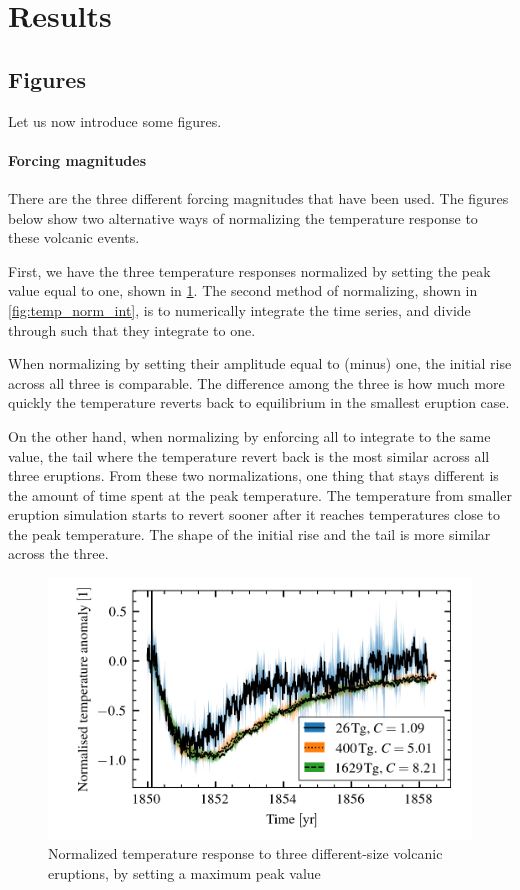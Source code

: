 \documentclass[twocol]{ametsocV5}
\begin{document}
\section{Results}

\subsection{Figures}

Let us now introduce some figures.

\paragraph{Forcing magnitudes}

There are the three different forcing magnitudes that have been used. The figures below
show two alternative ways of normalizing the temperature response to these volcanic
events.

First, we have the three temperature responses normalized by setting the peak value
equal to one, shown in \cref{fig:temp_norm_max}. The second method of normalizing, shown
in \cref{fig:temp_norm_int}, is to numerically integrate the time series, and divide
through such that they integrate to one.

When normalizing by setting their amplitude equal to (minus) one, the initial rise
across all three is comparable. The difference among the three is how much more quickly
the temperature reverts back to equilibrium in the smallest eruption case.

On the other hand, when normalizing by enforcing all to integrate to the same value, the
tail where the temperature revert back is the most similar across all three eruptions.
From these two normalizations, one thing that stays different is the amount of time
spent at the peak temperature. The temperature from smaller eruption simulation starts
to revert sooner after it reaches temperatures close to the peak temperature. The shape
of the initial rise and the tail is more similar across the three.

\begin{figure}
  \begin{center}
    \includegraphics[width=0.95\linewidth]{figures/compare-waveform-max.png}
  \end{center}
  \caption{Normalized temperature response to three different-size volcanic eruptions,
    by setting a maximum peak value}%
  \label{fig:temp_norm_max}
\end{figure}
\end{document}
